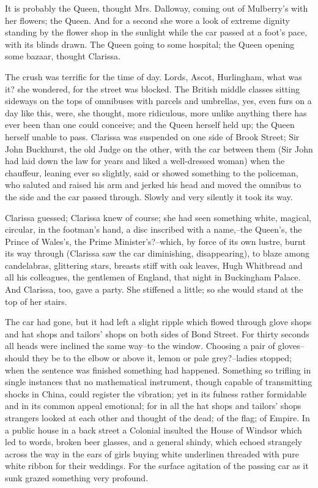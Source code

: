 \documentclass[lang=cn,10pt]{elegantbook}
\begin{document}
It is probably the Queen, thought Mrs. Dalloway, coming out of
Mulberry's with her flowers; the Queen.  And for a second she wore
a look of extreme dignity standing by the flower shop in the
sunlight while the car passed at a foot's pace, with its blinds
drawn.  The Queen going to some hospital; the Queen opening some
bazaar, thought Clarissa.

The crush was terrific for the time of day.  Lords, Ascot,
Hurlingham, what was it? she wondered, for the street was blocked.
The British middle classes sitting sideways on the tops of
omnibuses with parcels and umbrellas, yes, even furs on a day like
this, were, she thought, more ridiculous, more unlike anything
there has ever been than one could conceive; and the Queen herself
held up; the Queen herself unable to pass.  Clarissa was suspended
on one side of Brook Street; Sir John Buckhurst, the old Judge on
the other, with the car between them (Sir John had laid down the
law for years and liked a well-dressed woman) when the chauffeur,
leaning ever so slightly, said or showed something to the
policeman, who saluted and raised his arm and jerked his head and
moved the omnibus to the side and the car passed through.  Slowly
and very silently it took its way.

Clarissa guessed; Clarissa knew of course; she had seen something
white, magical, circular, in the footman's hand, a disc inscribed
with a name,--the Queen's, the Prince of Wales's, the Prime
Minister's?--which, by force of its own lustre, burnt its way
through (Clarissa saw the car diminishing, disappearing), to blaze
among candelabras, glittering stars, breasts stiff with oak leaves,
Hugh Whitbread and all his colleagues, the gentlemen of England,
that night in Buckingham Palace.  And Clarissa, too, gave a party.
She stiffened a little; so she would stand at the top of her
stairs.

The car had gone, but it had left a slight ripple which flowed
through glove shops and hat shops and tailors' shops on both sides
of Bond Street.  For thirty seconds all heads were inclined the
same way--to the window.  Choosing a pair of gloves--should they be
to the elbow or above it, lemon or pale grey?--ladies stopped; when
the sentence was finished something had happened.  Something so
trifling in single instances that no mathematical instrument,
though capable of transmitting shocks in China, could register the
vibration; yet in its fulness rather formidable and in its common
appeal emotional; for in all the hat shops and tailors' shops
strangers looked at each other and thought of the dead; of the
flag; of Empire.  In a public house in a back street a Colonial
insulted the House of Windsor which led to words, broken beer
glasses, and a general shindy, which echoed strangely across the
way in the ears of girls buying white underlinen threaded with pure
white ribbon for their weddings.  For the surface agitation of the
passing car as it sunk grazed something very profound.
\end{document}
